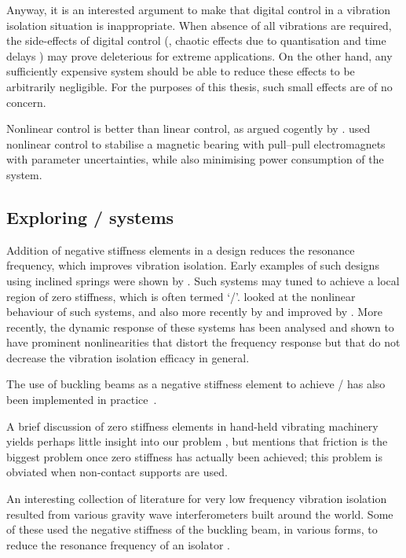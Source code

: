 \cite{zuo2004}

Anyway, it is an interested argument to make that digital control in a
vibration isolation situation is inappropriate.
When absence of all
vibrations are required, the side-effects of digital control (\ie,
chaotic effects due to quantisation and time delays
\cite{csernak2007}) may prove deleterious for extreme applications.
On
the other hand, any sufficiently expensive system should be able to
reduce these effects to be arbitrarily negligible.
For the purposes of
this thesis, such small effects are of no concern.


Nonlinear control is better than linear control, as argued cogently by
\textcite{kokotovic1992}.
\textcite{queiroz2007} used nonlinear
control to stabilise a magnetic bearing with pull--pull electromagnets
with parameter uncertainties, while also minimising power consumption
of the system.


\subsection{Exploring \qzs/ systems}

Addition of negative stiffness elements in a design reduces the resonance
frequency, which improves vibration isolation.
Early examples of such designs
using inclined springs were shown by \textcite{molyneux1957}.
Such systems may
tuned to achieve a local region of zero stiffness, which is often termed
`\qzs/'.
\textcite{alabuzhev1989} looked at the nonlinear behaviour of such
systems, and also more recently by
\textcite{carrella2006,carrella2007,carrella2008} and improved by
\textcite{kovacic2008}.
More recently, the dynamic response of these systems
has been analysed \parencite{carrella2009,carrella2008thesis} and shown to
have prominent nonlinearities that distort the frequency response but that do
not decrease the vibration isolation efficacy in general.

The use of buckling beams as a negative stiffness element to achieve \qzs/ has
also been implemented in practice~\cite{platus1999,tarnai2003,lee2007}.

A brief discussion of zero stiffness elements in hand-held vibrating
machinery yields perhaps little insight into our problem
\cite{sokolov2007}, but mentions that friction is the biggest problem
once zero stiffness has actually been achieved; this problem is
obviated when non-contact supports are used.

An interesting collection of literature for very low frequency vibration
isolation resulted from various gravity wave interferometers built around the
world.
Some of these used the negative stiffness of the buckling beam, in
various forms, to reduce the resonance frequency of an isolator
\cite{cella2005}.

